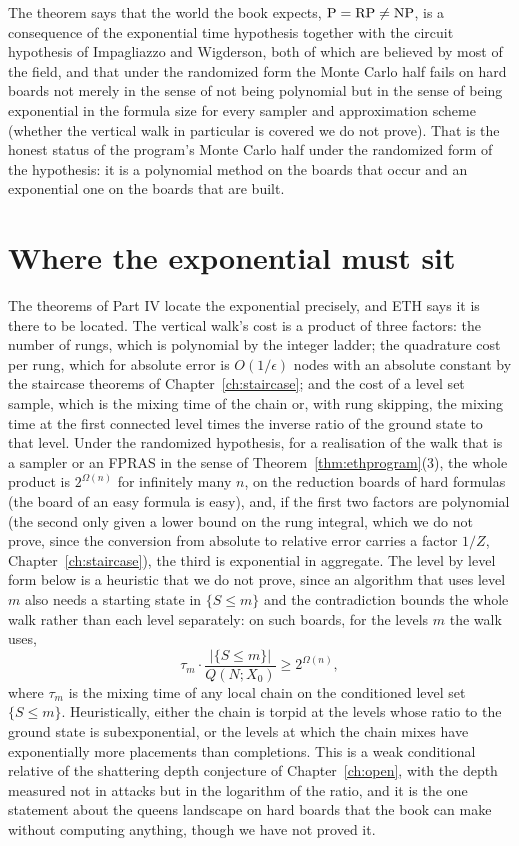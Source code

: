 The theorem says that the world the book expects, $\mathrm{P} = \mathrm{RP} \ne \mathrm{NP}$, is a consequence of the exponential time hypothesis together with the circuit hypothesis of Impagliazzo and Wigderson, both of which are believed by most of the field, and that under the randomized form the Monte Carlo half fails on hard boards not merely in the sense of not being polynomial but in the sense of being exponential in the formula size for every sampler and approximation scheme (whether the vertical walk in particular is covered we do not prove). That is the honest status of the program's Monte Carlo half under the randomized form of the hypothesis: it is a polynomial method on the boards that occur and an exponential one on the boards that are built.

\section{Where the exponential must sit}

The theorems of Part IV locate the exponential precisely, and ETH says it is there to be located. The vertical walk's cost is a product of three factors: the number of rungs, which is polynomial by the integer ladder; the quadrature cost per rung, which for absolute error is $O(1 / \epsilon)$ nodes with an absolute constant by the staircase theorems of Chapter~\ref{ch:staircase}; and the cost of a level set sample, which is the mixing time of the chain or, with rung skipping, the mixing time at the first connected level times the inverse ratio of the ground state to that level. Under the randomized hypothesis, for a realisation of the walk that is a sampler or an FPRAS in the sense of Theorem~\ref{thm:ethprogram}(3), the whole product is $2^{\Omega(n)}$ for infinitely many $n$, on the reduction boards of hard formulas (the board of an easy formula is easy), and, if the first two factors are polynomial (the second only given a lower bound on the rung integral, which we do not prove, since the conversion from absolute to relative error carries a factor $1/Z$, Chapter~\ref{ch:staircase}), the third is exponential in aggregate. The level by level form below is a heuristic that we do not prove, since an algorithm that uses level $m$ also needs a starting state in $\{S \le m\}$ and the contradiction bounds the whole walk rather than each level separately: on such boards, for the levels $m$ the walk uses,
\[
\tau_m \cdot \frac{ |\{ S \le m \}| }{ Q(N; X_0) } \ge 2^{\Omega(n)} ,
\]
where $\tau_m$ is the mixing time of any local chain on the conditioned level set $\{ S \le m \}$. Heuristically, either the chain is torpid at the levels whose ratio to the ground state is subexponential, or the levels at which the chain mixes have exponentially more placements than completions. This is a weak conditional relative of the shattering depth conjecture of Chapter~\ref{ch:open}, with the depth measured not in attacks but in the logarithm of the ratio, and it is the one statement about the queens landscape on hard boards that the book can make without computing anything, though we have not proved it.

